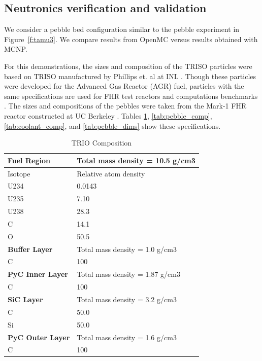 \subsection{Neutronics verification and validation}

We consider a pebble bed configuration similar to the pebble experiment in Figure~\ref{f:tamu3}.
We compare results from OpenMC versus results obtained with MCNP.

For this demonstrations, the sizes and composition of the TRISO particles were based on TRISO
manufactured by Phillips et. al at INL \cite{phillips2010}.  Though these particles were developed
for the Advanced Gas Reactor (AGR) fuel, particles with the same specifications are used for FHR
test reactors and computations benchmarks \cite{charalampos2014}.  The sizes and compositions of
the pebbles were taken from the Mark-1 FHR reactor constructed at UC Berkeley
\cite{charalampos2014}.  Tables \ref{tab:triso_comp}, \ref{tab:pebble_comp},
\ref{tab:coolant_comp}, and \ref{tab:pebble_dims} show these specifications.

\begin{table}
  \centering
  \begin{tabular}{|ll|}
    \hline \hline
    \textbf{Fuel Region}	 & Total mass density = 10.5 g/cm3 \\
    \hline
    Isotope	     & Relative atom density \\
    U234	       & 0.0143 \\
    U235	       & 7.10 \\
    U238	       & 28.3 \\
    C	           & 14.1 \\
    O	           & 50.5 \\
    \hline \hline
    \textbf{Buffer Layer} & Total mass density = 1.0 g/cm3 \\
    \hline
    C	           & 100 \\
    \hline \hline
    \textbf{PyC Inner Layer}	   & Total mass density = 1.87 g/cm3 \\
    \hline
    C	           & 100 \\
    \hline \hline
    \textbf{SiC Layer}	   & Total mass density = 3.2 g/cm3 \\
    \hline
    C	           & 50.0 \\
    Si	         & 50.0 \\
    \hline \hline
    \textbf{PyC Outer Layer}	     & Total mass density = 1.6 g/cm3 \\
    \hline
    C	           & 100 \\
    \hline \hline
  \end{tabular}
  \caption{TRIO Composition}
  \label{tab:triso_comp}
\end{table}


